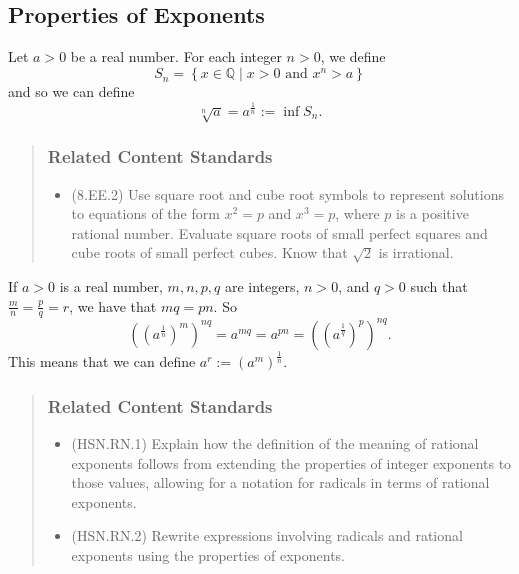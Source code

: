 \documentclass[
]{book}
\providecommand{\tightlist}{%
  \setlength{\itemsep}{0pt}\setlength{\parskip}{0pt}}
\theoremstyle{definition}
\theoremstyle{definition}
\theoremstyle{definition}
\theoremstyle{remark}
\begin{document}
\hypertarget{subsec:real-exponents}{%
\subsection{Properties of Exponents}\label{subsec:real-exponents}}

Let \(a>0\) be a real number. For each integer \(n>0\), we define \[S_n= \left\{ x\in \mathbb{Q}\middle \vert x>0 \mbox{ and } x^n>a\right\}\] and so we can define \[\sqrt[n]{a}=a^{\frac{1}{n}} := \inf S_n.\]

\begin{quote}
\hypertarget{related-content-standards-16}{%
\subsubsection*{Related Content Standards}\label{related-content-standards-16}}

\begin{itemize}
\tightlist
\item
  (8.EE.2) Use square root and cube root symbols to represent solutions to equations of the form \(x^2=p\) and \(x^3=p\), where \(p\) is a positive rational number. Evaluate square roots of small perfect squares and cube roots of small perfect cubes. Know that \(\sqrt{2}\) is irrational.
\end{itemize}
\end{quote}

If \(a>0\) is a real number, \(m,n,p,q\) are integers, \(n>0\), and \(q>0\) such that \(\frac{m}{n}=\frac{p}{q}=r\), we have that \(mq=pn\). So \[\left(\left(a^{\frac{1}{n}}\right)^m\right)^{nq} = a^{mq} = a^{pn} = \left( \left( a^{\frac{1}{q}} \right)^p \right)^{nq}.\] This means that we can define \(a^r:=\left(a^m\right)^{\frac{1}{n}}\).

\begin{quote}
\hypertarget{related-content-standards-17}{%
\subsubsection*{Related Content Standards}\label{related-content-standards-17}}

\begin{itemize}
\tightlist
\item
  (HSN.RN.1) Explain how the definition of the meaning of rational exponents follows from extending the properties of integer exponents to those values, allowing for a notation for radicals in terms of rational exponents.
\item
  (HSN.RN.2) Rewrite expressions involving radicals and rational exponents using the properties of exponents.
\end{itemize}
\end{quote}
\end{document}
